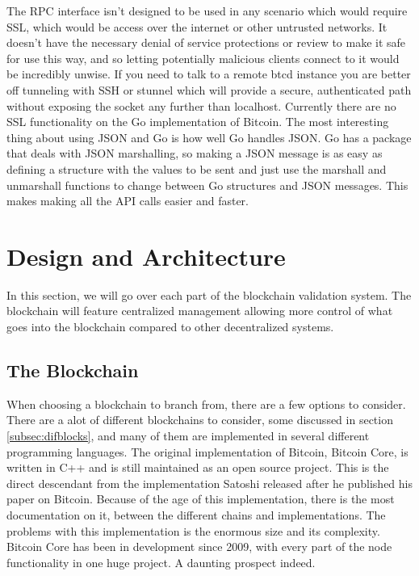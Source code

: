 \documentclass[12pt]{article}
\begin{document}
The RPC interface isn't designed to be used in any scenario which would require SSL, which would be access over the internet or other untrusted networks. It doesn't have the necessary denial of service protections or review to make it safe for use this way, and so letting potentially malicious clients connect to it would be incredibly unwise. If you need to talk to a remote btcd instance you are better off tunneling with SSH or stunnel which will provide a secure, authenticated path without exposing the socket any further than localhost. Currently there are no SSL functionality on the Go implementation of Bitcoin. The most interesting thing about using JSON and Go is how well Go handles JSON. Go has a package that deals with JSON marshalling, so making a JSON message is as easy as defining a structure with the values to be sent and just use the marshall and unmarshall functions to change between Go structures and JSON messages. This makes making all the API calls easier and faster.

\section{Design and Architecture}

In this section, we will go over each part of the blockchain validation system. The blockchain will feature centralized management allowing more control of what goes into the blockchain compared to other decentralized systems.

\subsection{The Blockchain}

When choosing a blockchain to branch from, there are a few options to consider. There are a alot of different blockchains to consider, some discussed in section \ref{subsec:difblocks}, and many of them are implemented in several different programming languages. The original implementation of Bitcoin, Bitcoin Core, is written in C++ and is still maintained as an open source project. This is the direct descendant from the implementation Satoshi released after he published his paper on Bitcoin. Because of the age of this implementation, there is the most documentation on it, between the different chains and implementations. The problems with this implementation is the enormous size and its complexity. Bitcoin Core has been in development since 2009, with every part of the node functionality in one huge project. A daunting prospect indeed.
\end{document}
